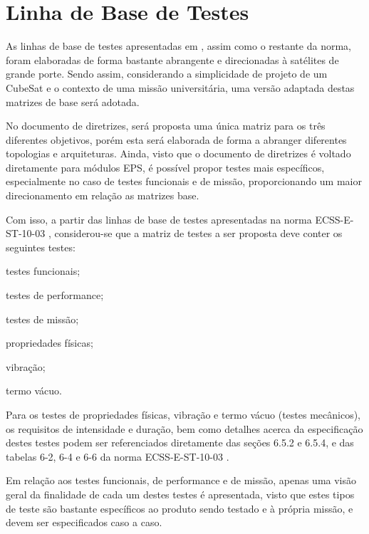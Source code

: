 \section{Linha de Base de Testes} \label{sec:linhas-base}

As linhas de base de testes apresentadas em \textcite{ecss-e-st-10-03}, assim como o restante da norma, foram elaboradas de forma bastante abrangente e direcionadas à satélites de grande porte.
Sendo assim, considerando a simplicidade de projeto de um CubeSat e o contexto de uma missão universitária, uma versão adaptada destas matrizes de base será adotada.

No documento de diretrizes, será proposta uma única matriz para os três diferentes objetivos, porém esta será elaborada de forma a abranger diferentes topologias e arquiteturas.
Ainda, visto que o documento de diretrizes é voltado diretamente para módulos \gls{EPS}, é possível propor testes mais específicos, especialmente no caso de testes funcionais e de missão, proporcionando um maior direcionamento em relação as matrizes base.


Com isso, a partir das linhas de base de testes apresentadas na norma ECSS-E-ST-10-03 \cite{ecss-e-st-10-03}, considerou-se que a matriz de testes a ser proposta deve conter os seguintes testes:

\begin{alineas}
    \item testes funcionais;
    \item testes de performance;
    \item testes de missão;
    \item propriedades físicas;
    \item vibração;
    \item termo vácuo.
\end{alineas}




Para os testes de propriedades físicas, vibração e termo vácuo (testes mecânicos), os requisitos de intensidade e duração, bem como detalhes acerca da especificação destes testes podem ser referenciados diretamente das seções 6.5.2 e 6.5.4, e das tabelas 6-2, 6-4 e 6-6 da norma ECSS-E-ST-10-03 \cite{ecss-e-st-10-03}.

Em relação aos testes funcionais, de performance e de missão, apenas uma visão geral da finalidade de cada um destes testes é apresentada, visto que estes tipos de teste são bastante específicos ao produto sendo testado e à própria missão, e devem ser especificados caso a caso.


